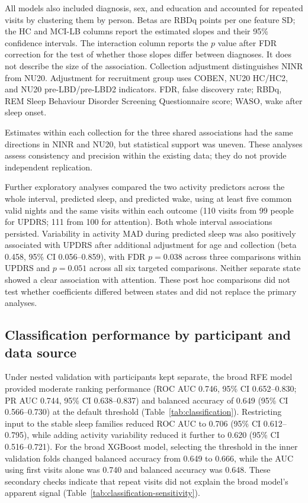 \documentclass[referee,pdflatex,sn-vancouver-num]{sn-jnl}
\begin{document}
\begin{table}[!b]
\medskip
\begin{minipage}{0.96\textwidth}\footnotesize
All models also included diagnosis, sex, and education and accounted for repeated
visits by clustering them by person. Betas are RBDq points per one feature SD;
the HC and MCI-LB columns report the estimated slopes and their 95\% confidence
intervals. The interaction column reports the $p$ value after FDR correction
for the test of whether those slopes differ between diagnoses. It does not
describe the size of the association.
Collection adjustment distinguishes NINR from NU20. Adjustment for recruitment
group uses COBEN, NU20 HC/HC2, and NU20 pre-LBD/pre-LBD2 indicators.
FDR, false discovery rate; RBDq, REM Sleep
Behaviour Disorder Screening Questionnaire score; WASO, wake after sleep onset.
\end{minipage}
\end{table}

Estimates within each collection for the three shared associations had the same
directions in NINR and NU20, but statistical support was uneven.
These analyses assess consistency and precision within the existing data;
they do not provide independent replication.

Further exploratory analyses compared the two activity predictors across the
whole interval, predicted sleep, and predicted wake, using at least five common
valid nights and the same visits within each outcome (110 visits from 99 people
for UPDRS; 111 from 100 for attention). Both whole interval associations
persisted. Variability in activity MAD during predicted sleep was also
positively associated with UPDRS after additional adjustment for age and
collection (beta 0.458, 95\% CI 0.056--0.859), with FDR $p=0.038$ across three
comparisons within UPDRS and $p=0.051$ across all six targeted comparisons.
Neither separate state showed a clear association with attention. These post
hoc comparisons did not test whether coefficients differed between states and
did not replace the primary analyses.

\FloatBarrier
\subsection{Classification performance by participant and data source}\label{subsec:classification-results}

Under nested validation with participants kept separate, the broad RFE model provided
moderate ranking performance (ROC AUC 0.746, 95\% CI 0.652--0.830; PR AUC
0.744, 95\% CI 0.638--0.837) and balanced accuracy of 0.649 (95\% CI
0.566--0.730) at the default threshold (Table~\ref{tab:classification}).
Restricting input
to the stable sleep families reduced ROC AUC to 0.706 (95\% CI 0.612--0.795),
while adding activity variability reduced it further to 0.620 (95\% CI
0.516--0.721). For the broad XGBoost model, selecting the threshold in the inner validation folds changed
balanced accuracy from 0.649 to 0.666, while the AUC using first visits alone was 0.740
and balanced accuracy was 0.648. These secondary checks indicate that repeat
visits did not explain the broad model's apparent signal
(Table~\ref{tab:classification-sensitivity}).
\end{document}
